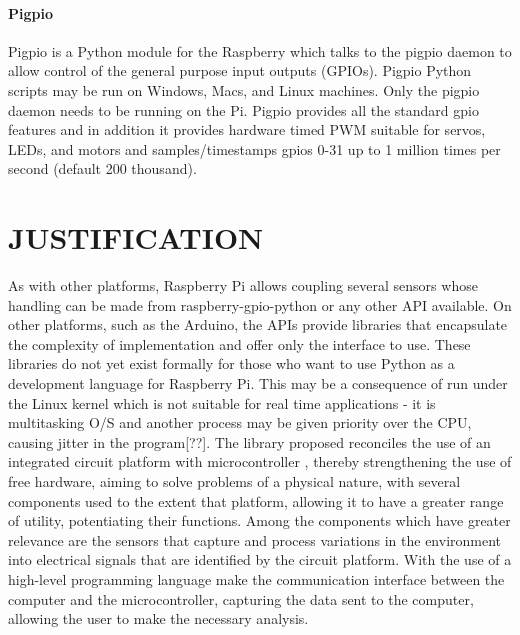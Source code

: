 \documentclass{acm_proc_article-sp}
\begin{document}
\paragraph{Pigpio}
Pigpio is a Python module for the Raspberry which talks to the pigpio daemon to allow control of the general purpose input outputs (GPIOs). Pigpio Python scripts may be run on Windows, Macs, and Linux machines. Only the pigpio daemon needs to be running on the Pi.
\newline
\newline
Pigpio provides all the standard gpio features and in addition it provides hardware timed PWM suitable for servos, LEDs, and motors and samples/timestamps gpios 0-31 up to 1 million times per second (default 200 thousand).

\section{JUSTIFICATION}
As with other platforms, Raspberry Pi allows coupling several sensors whose handling can be made from raspberry-gpio-python or any other API available. On other platforms, such as the Arduino, the APIs provide libraries that encapsulate the complexity of implementation and offer only the interface to use. These libraries do not yet exist formally for those who want to use Python as a development language for Raspberry Pi.
\newline
\newline
This may be a consequence of run under the Linux kernel which is not suitable for real time applications - it is multitasking O/S and another process may be given priority over the CPU, causing jitter in the program[??].
\newline
\newline
The library proposed reconciles the use of an integrated circuit platform with microcontroller , thereby strengthening the use of free hardware, aiming to solve problems of a physical nature, with several components used to the extent that platform, allowing it to have a greater range of utility, potentiating their functions.
Among the components which have greater relevance are the sensors that capture and process variations in the environment into electrical signals that are identified by the circuit platform. With the use of a high-level programming language make the communication interface between the computer and the microcontroller, capturing the data sent to the computer, allowing the user to make the necessary analysis.
\end{document}
